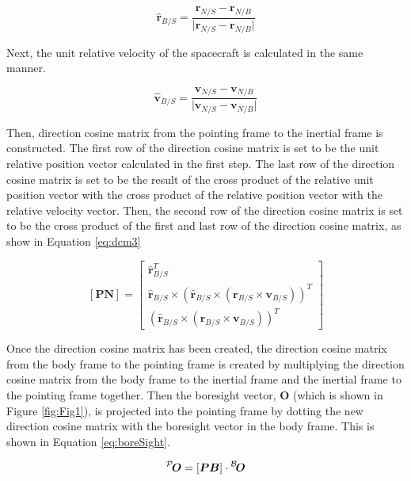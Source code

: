  \begin{equation}
 	\label{eq:rePos}
 	\hat{\bm r}_{B/S} = \frac{\bm r_{N/S} - \bm r_{N/B}}{\vert \bm r_{N/S} - \bm r_{N/B} \vert}
\end{equation}

Next, the unit relative velocity of the spacecraft is calculated in the same manner.

 \begin{equation}
 	\label{eq:reVel}
 	\hat{\bm v}_{B/S} = \frac{\bm v_{N/S} - \bm v_{N/B}}{\vert \bm v_{N/S} - \bm v_{N/B} \vert}
\end{equation}

Then, direction cosine matrix from the pointing frame to the inertial frame is constructed. The first row of the direction cosine matrix is set to be the unit relative position vector calculated in the first step. The last row of the direction cosine matrix is set to be the result of the cross product of the relative unit position vector with the cross product of the relative position vector with the relative velocity vector. Then, the second row of the direction cosine matrix is set to be the cross product of the first and last row of the direction cosine matrix, as show in Equation \ref{eq:dcm3}

 \begin{equation}
 	\label{eq:dcm3}
 	[\bm{PN}] =  \begin{bmatrix}
    \hat{ \bm r}_{B/S}^T \\
    \hat{ \bm r}_{B/S} \times (\hat{\bm r}_{B/S}  \times  (\bm r_{B/S}  \times \bm v_{B/S})) ^T\\
    (\hat{\bm r}_{B/S}  \times  (\bm r_{B/S}  \times \bm v_{B/S}))^T
    \end{bmatrix}
\end{equation}

 Once the direction cosine matrix has been created, the direction cosine matrix from the body frame to the pointing frame is created by multiplying the direction cosine matrix from the body frame to the inertial frame and the inertial frame to the pointing frame together. Then the boresight vector, $\bm O$ (which is shown in Figure \ref{fig:Fig1}), is projected into the pointing frame by dotting the new direction cosine matrix with the boresight vector in the body frame. This is shown in Equation \ref{eq:boreSight}.

 \begin{equation}
 	\label{eq:boreSight}
 	\leftexp{P}{\bm {O}} = [\bm{PB}] \cdot\leftexp{B}{\bm {O}}
\end{equation}

